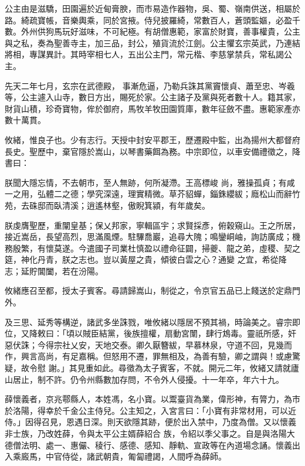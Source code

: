 \begin{pinyinscope}
 公主由是滋驕，田園遍於近甸膏腴，而市易造作器物，吳、蜀、嶺南供送，相屬於路。綺疏寶帳，音樂輿乘，同於宮掖。侍兒披羅綺，常數百人，蒼頭監嫗，必盈千數。外州供狗馬玩好滋味，不可紀極。有胡僧惠範，家富於財寶，善事權貴，公主與之私，奏為聖善寺主，加三品，封公，殖貨流於江劍。公主懼玄宗英武，乃連結將相，專謀異計。其時宰相七人，五出公主門，常元楷、李慈掌禁兵，常私謁公主。



 先天二年七月，玄宗在武德殿，
 事漸危逼，乃勒兵誅其黨竇懷貞、蕭至忠、岑羲等，公主遽入山寺，數日方出，賜死於家。公主諸子及黨與死者數十人。籍其家，財貨山積，珍奇寶物，侔於御府，馬牧羊牧田園質庫，數年征斂不盡。惠範家產亦數十萬貫。



 攸緒，惟良子也。少有志行。天授中封安平郡王，歷遷殿中監，出為揚州大都督府長史。聖歷中，棄官隱於嵩山，以琴書藥餌為務。中宗即位，以車安備禮徵之，降書曰：



 朕聞大隱忘情，不去朝市，至人無跡，何所凝滯。王高標峻
 尚，雅操孤貞；有咸一之用，弘體二之德；學究深遠，理實精微。草芥貂蟬，錙銖纓紱；廕松山而辭竹苑，去硃邸而臥清溪；逍遙林壑，傲睨箕潁，有年歲矣。



 朕虔膺聖歷，重闡皇基；保乂邦家，寧輯區宇；求賢採彥，俯穀窺山。王之所居，接近嵩岳，長望高烈，思滿風煙。駐驆喬巖，追尋大隗；鳴鑾峒岫，詢訪廣成；機務殷繁，有懷莫遂。今遣國子司業杜慎盈以禮命征闢，掃夔、龍之弟，虛稷、契之筵，神化丹青，朕之志也。豈以黃屋之貴，傾彼白雲之心？通變
 之宜，希從降志；延貯閶闔，若在汾陽。



 攸緒應召至都，授太子賓客。尋請歸嵩山，制從之，令京官五品已上餞送於定鼎門外。



 及三思、延秀等構逆，諸武多坐誅戮，唯攸緒以隱居不預其禍，時論美之。睿宗即位，又降敕曰：「頃以賊臣結黨，後族擅權，扇動宮闈，肆行鴆毒。靈祇所感，奸惡伏誅；今得宗社乂安，天地交泰。卿久厭簪紱，早慕林泉，守道不回，見幾而作，興言高尚，有足嘉稱。但怒用不遷，罪無相及，為善有驗，卿之謂與！或慮驚疑，故令慰
 謝。」其見重如此。尋徵為太子賓客，不就。開元二年，攸緒又請就廬山居止，制不許。仍令州縣數加存問，不令外人侵擾。十一年卒，年六十九。



 薛懷義者，京兆鄠縣人，本姓馮，名小寶。以鬻臺貨為業，偉形神，有膂力，為市於洛陽，得幸於千金公主侍兒。公主知之，入宮言曰：「小寶有非常材用，可以近侍。」因得召見，恩遇日深。則天欲隱其跡，便於出入禁中，乃度為僧。又以懷義非士族，乃改姓薛，令與太平公主婿薛紹合
 族，令紹以季父事之。自是與洛陽大德僧法明、處一、惠儼、稜行、感德、感知、靜軌、宣政等在內道場念誦。懷義出入乘廄馬，中官侍從，諸武朝貴，匍匐禮謁，人間呼為薛師。




\end{pinyinscope}
